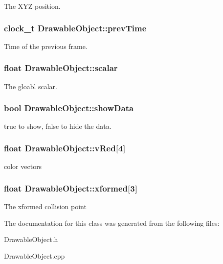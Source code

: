 The X\-Y\-Z position. \hypertarget{class_drawable_object_af460310076bad5748078c84c4ddd7f60}{
\subsubsection[{prev\-Time}]{\setlength{\rightskip}{0pt plus 5cm}clock\-\_\-t {\bf Drawable\-Object\-::prev\-Time}}}\label{class_drawable_object_af460310076bad5748078c84c4ddd7f60}
Time of the previous frame. \hypertarget{class_drawable_object_a099a45653005dc07dff68e40465e7838}{
\subsubsection[{scalar}]{\setlength{\rightskip}{0pt plus 5cm}float {\bf Drawable\-Object\-::scalar}}}\label{class_drawable_object_a099a45653005dc07dff68e40465e7838}
The gloabl scalar. \hypertarget{class_drawable_object_aaec51d93bc4b79cf9fff8fdd30033e09}{
\subsubsection[{show\-Data}]{\setlength{\rightskip}{0pt plus 5cm}bool {\bf Drawable\-Object\-::show\-Data}}}\label{class_drawable_object_aaec51d93bc4b79cf9fff8fdd30033e09}
true to show, false to hide the data. \hypertarget{class_drawable_object_a5b57b3602270163662876bb86277602f}{
\subsubsection[{v\-Red}]{\setlength{\rightskip}{0pt plus 5cm}float {\bf Drawable\-Object\-::v\-Red}\mbox{[}4\mbox{]}}}\label{class_drawable_object_a5b57b3602270163662876bb86277602f}
color vectors \hypertarget{class_drawable_object_a8c8fb8681530026cd28f4bff61d37bdd}{
\subsubsection[{xformed}]{\setlength{\rightskip}{0pt plus 5cm}float {\bf Drawable\-Object\-::xformed}\mbox{[}3\mbox{]}}}\label{class_drawable_object_a8c8fb8681530026cd28f4bff61d37bdd}
The xformed collision point 

The documentation for this class was generated from the following files\-:\begin{DoxyCompactItemize}
\item 
Drawable\-Object.\-h\item 
Drawable\-Object.\-cpp\end{DoxyCompactItemize}
